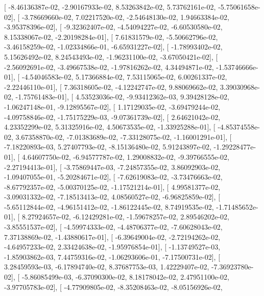 \documentclass{article}
\begin{document}
       [ -8.46136387e-02,  -2.90167933e-02,   8.53263842e-02,
          5.73762161e-02,  -5.75061658e-02],
       [ -3.78669660e-02,   7.02217520e-02,  -2.54648130e-02,
          1.94663384e-02,  -3.95378396e-02],
       [ -9.32362407e-02,  -4.54094227e-02,  -6.60530580e-02,
          8.15338067e-02,  -2.20198284e-01],
       [  7.61831579e-02,  -5.50662796e-02,  -3.46158259e-02,
         -1.02334866e-01,  -6.65931227e-02],
       [ -1.78993402e-02,   5.15626492e-02,   8.24543493e-02,
         -1.96231100e-02,  -3.67050421e-02],
       [ -2.56092691e-02,  -3.49667538e-02,  -1.97816262e-02,
          4.34494871e-02,  -1.53746666e-01],
       [ -4.54046583e-02,   5.17366884e-02,   7.53115065e-02,
          6.00261337e-02,  -2.22446110e-01],
       [  7.36318605e-02,  -4.12242747e-02,   9.88069662e-02,
          3.39030968e-02,  -1.75761483e-01],
       [  4.53523036e-02,  -9.93412362e-03,   9.39428128e-02,
         -1.06247148e-01,  -9.12895567e-02],
       [  1.17129035e-02,  -3.69479244e-02,  -4.09758846e-02,
         -1.75175229e-03,  -9.07361739e-02],
       [  2.64621042e-02,   4.23352299e-02,   5.31325916e-02,
          4.50673535e-02,  -1.33925288e-01],
       [ -4.85374558e-02,   3.67358870e-02,  -7.01383689e-02,
         -7.33128075e-02,  -1.16001291e-01],
       [ -7.18220893e-03,   5.27407793e-02,  -8.15136480e-02,
          5.91243897e-02,  -1.29228477e-01],
       [  4.64607750e-02,  -6.94577787e-02,   1.29008832e-02,
         -9.39766555e-02,  -2.27194413e-01],
       [ -3.75869447e-03,  -7.24857355e-02,   3.86092903e-02,
         -1.09407055e-01,  -5.20284671e-02],
       [ -7.62619083e-02,  -3.73476663e-02,  -8.67792357e-02,
         -5.00370125e-02,  -1.17521214e-01],
       [  4.99581377e-02,  -3.09031332e-02,  -7.18513413e-02,
          4.08560527e-02,  -6.96825859e-02],
       [ -5.65112844e-02,  -4.96151412e-02,  -1.86122445e-02,
          8.74919535e-02,  -1.71485652e-01],
       [  8.27924657e-02,  -6.12429281e-02,  -1.59678257e-02,
          2.89546202e-02,  -3.85551537e-02],
       [ -4.59974333e-02,  -4.48706377e-02,  -7.60628043e-02,
          7.37138869e-02,  -1.43880617e-01],
       [ -6.39649004e-02,  -2.72194262e-02,  -4.64957233e-02,
          2.33424638e-02,  -1.95976854e-01],
       [ -1.13749527e-03,  -1.85903862e-03,   7.44759316e-02,
         -1.06293606e-01,  -7.17500731e-02],
       [  3.28459593e-03,  -6.17894740e-02,   8.37687753e-03,
          1.42229407e-02,  -7.36923780e-02],
       [ -5.86085499e-03,  -6.37090300e-02,   8.18178042e-02,
          2.47951100e-02,  -3.97705783e-02],
       [ -4.77909805e-02,  -8.35208463e-02,  -8.05156926e-02,
\end{document}
